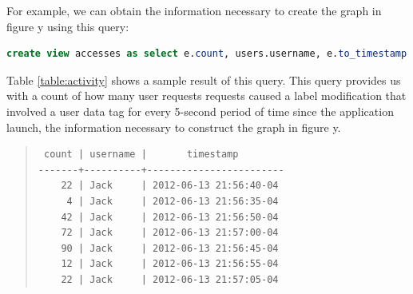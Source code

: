 For example, we can obtain the information necessary to create the graph in figure y using this query:

\begin{lstlisting}[language=SQL, deletendkeywords={TIMESTAMP}]
create view accesses as select e.count, users.username, e.to_timestamp as timestamp from (select count(*), tags_modified, (to_timestamp(((extract (epoch from events.timestamp)/5)::int)*5)) from events tags_modified in (select tag from users) group by (to_timestamp(((extract (epoch from events.timestamp)/5)::int)*5)), tags_modified) as e inner join users on e.tags_modified=users.tag
\end{lstlisting}

Table \ref{table:activity} shows a sample result of this query. This query provides us with a count of how many user requests requests caused a label modification that involved a user data tag for every 5-second period of time since the application launch, the information necessary to construct the graph in figure y.

\begin{table}[ht]
\begin{quote}
\begin{verbatim}
 count | username |       timestamp        
-------+----------+------------------------
    22 | Jack     | 2012-06-13 21:56:40-04
     4 | Jack     | 2012-06-13 21:56:35-04
    42 | Jack     | 2012-06-13 21:56:50-04
    72 | Jack     | 2012-06-13 21:57:00-04
    90 | Jack     | 2012-06-13 21:56:45-04
    12 | Jack     | 2012-06-13 21:56:55-04
    22 | Jack     | 2012-06-13 21:57:05-04
\end{verbatim}
\end{quote}
\caption*{Account activity for user \emph{Jack}}
\caption{This table shows a sample result of the \emph{accesses} view (for simplicity we only show the result for the user Jack). It details the number of user requests causing a label manipulation involving a user data tag for every 5-second period since the application launched. The \emph{count} denotes such number. The \emph{username} column denotes the user who's data tag is in question. The \emph{timestamp} column denotes the start of the 5-second period.}
\label{table:activity}
\end{table}

